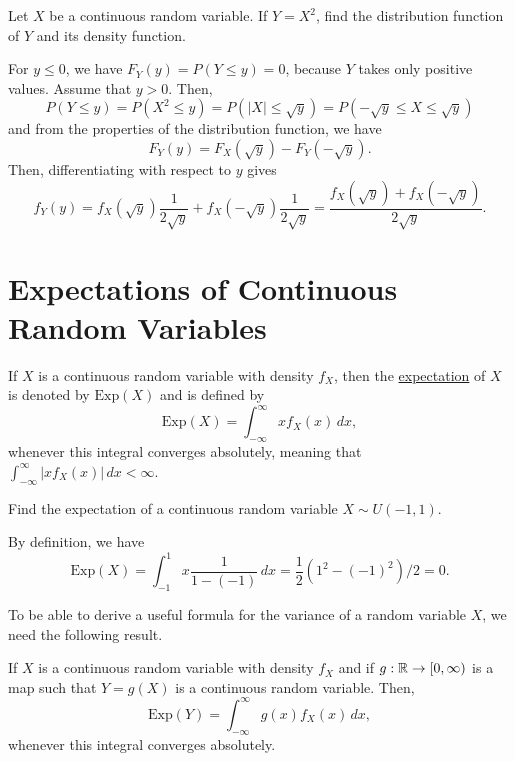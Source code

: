 \begin{example}
Let $X$ be a continuous random variable. If $Y = X^2$, find the distribution function of $Y$ and its density function.
\end{example}

\begin{sol*}
For $y \leq 0$, we have $F_Y (y) = P (Y \leq y) = 0$, because $Y$ takes only positive values. Assume that $y > 0$. Then,
    \[
        P (Y \leq y ) = P (X^2 \leq y) = P (|X| \leq \sqrt{y}) = P (-\sqrt{y} \leq X \leq \sqrt{y}) 
    \]
and from the properties of the distribution function, we have
    \[
        F_Y (y) = F_X (\sqrt{y}) - F_Y (-\sqrt{y}) .
    \]
Then, differentiating with respect to $y$ gives
    \[
        f_Y (y) = f_X (\sqrt{y}) \frac{1}{2\sqrt{y}} + f_X (-\sqrt{y}) \frac{1}{2 \sqrt{y}} = \frac{f_X (\sqrt{y}) + f_X (-\sqrt{y})}{2 \sqrt{y}} . \tag*{$\triangle$}
    \]
\end{sol*}

\section{Expectations of Continuous Random Variables}

\begin{definition}
If $X$ is a continuous random variable with density $f_X$, then the \underline{expectation} of $X$ is denoted by $\mathrm{Exp} (X)$ and is defined by
    \[
        \mathrm{Exp} (X) = \int_{-\infty}^\infty x f_X (x) \, dx ,
    \]
whenever this integral converges absolutely, meaning that $\displaystyle \int_{-\infty}^\infty |x f_X (x)| \, dx < \infty$. 
\end{definition}

\begin{example}
Find the expectation of a continuous random variable $X \sim U (-1, 1)$. 
\end{example}

\begin{sol*}
By definition, we have
    \[
        \mathrm{Exp} (X) = \int_{-1}^1 x \frac{1}{1 - (-1)} \, dx = \frac{1}{2} (1^2 - (-1)^2)/2 = 0 . \tag*{$\triangle$} 
    \]
\end{sol*}

To be able to derive a useful formula for the variance of a random variable $X$, we need the following result.

\begin{theorem}\label{Thm:LawSubStatis}
If $X$ is a continuous random variable with density $f_X$ and if $g : \mathbb{R} \rightarrow [0, \infty )$ is a map such that $Y = g(X)$ is a continuous random variable. Then,
    \[
        \mathrm{Exp} (Y) = \int_{-\infty}^\infty g (x) f_X (x) \, dx ,
    \]
whenever this integral converges absolutely.
\end{theorem}

